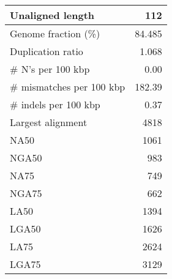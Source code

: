 \documentclass[12pt,a4paper]{article}
\begin{document}
\begin{table}[ht]
\begin{center}
\begin{tabular}{|l*{1}{|r}|}
Unaligned length & 112 \\ \hline
Genome fraction (\%) & 84.485 \\ \hline
Duplication ratio & 1.068 \\ \hline
\# N's per 100 kbp & 0.00 \\ \hline
\# mismatches per 100 kbp & 182.39 \\ \hline
\# indels per 100 kbp & 0.37 \\ \hline
Largest alignment & 4818 \\ \hline
NA50 & 1061 \\ \hline
NGA50 & 983 \\ \hline
NA75 & 749 \\ \hline
NGA75 & 662 \\ \hline
LA50 & 1394 \\ \hline
LGA50 & 1626 \\ \hline
LA75 & 2624 \\ \hline
LGA75 & 3129 \\ \hline
\end{tabular}
\end{center}
\end{table}
\end{document}
